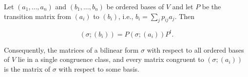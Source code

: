 Let $(a_1, \ldots, a_n)$ and $(b_1, \ldots, b_n)$ be ordered bases of $V$ and let $P$ be the transition matrix from $(a_i)$ to $(b_i)$, i.e., $b_i = \sum_j p_{ij} a_j$. Then

$$(\sigma; (b_i)) = P (\sigma; (a_i)) P^t.$$

Consequently, the matrices of a bilinear form $\sigma$ with respect to all ordered bases of $V$ lie in a single congruence class, and every matrix congruent to $(\sigma; (a_i))$ is the matrix of $\sigma$ with respect to some basis.
